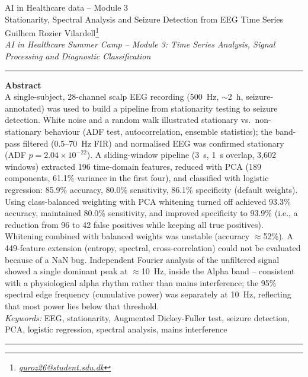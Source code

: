 ﻿\documentclass[a4paper,10pt]{article}
\begin{document}
\begin{center}
\vspace*{0mm}
{\large
AI in Healthcare data -- Module 3\\
\vspace{3mm}
Stationarity, Spectral Analysis and Seizure Detection from EEG Time Series
}\\
\vspace{8mm}
Guilhem Rozier Vilardell\footnote{\textit{\href{mailto:guroz26@student.sdu.dk}{guroz26@student.sdu.dk}}}
\\
\vspace{3mm}
\footnotesize{
\textit{AI in Healthcare Summer Camp -- Module 3: Time Series Analysis, Signal Processing and Diagnostic Classification}
}\\
\vspace{9mm}
\end{center}
\rule{\linewidth}{0.4pt}
\textbf{Abstract}\\
A single-subject, 28-channel scalp EEG recording (500~Hz, $\sim$2~h, seizure-annotated) was used to build a pipeline from stationarity testing to seizure detection. White noise and a random walk illustrated stationary vs.\ non-stationary behaviour (ADF test, autocorrelation, ensemble statistics); the band-pass filtered (0.5--70~Hz FIR) and normalised EEG was confirmed stationary (ADF $p=2.04\times10^{-22}$). A sliding-window pipeline (3~s, 1~s overlap, 3{,}602 windows) extracted 196 time-domain features, reduced with PCA (189 components, 61.1\% variance in the first four), and classified with logistic regression: 85.9\% accuracy, 80.0\% sensitivity, 86.1\% specificity (default weights). Using class-balanced weighting with PCA whitening turned off achieved 93.3\% accuracy, maintained 80.0\% sensitivity, and improved specificity to 93.9\% (i.e., a reduction from 96 to 42 false positives while keeping all true positives). Whitening combined with balanced weights was unstable (accuracy $\approx$52\%). A 449-feature extension (entropy, spectral, cross-correlation) could not be evaluated because of a NaN bug. Independent Fourier analysis of the unfiltered signal showed a single dominant peak at $\approx$10~Hz, inside the Alpha band -- consistent with a physiological alpha rhythm rather than mains interference; the 95\% spectral edge frequency (cumulative power) was separately at 10~Hz, reflecting that most power lies below that threshold.\\
\noindent\textit{Keywords:} EEG, stationarity, Augmented Dickey-Fuller test, seizure detection, PCA, logistic regression, spectral analysis, mains interference\\
\rule{\linewidth}{0.4pt}
\end{document}
